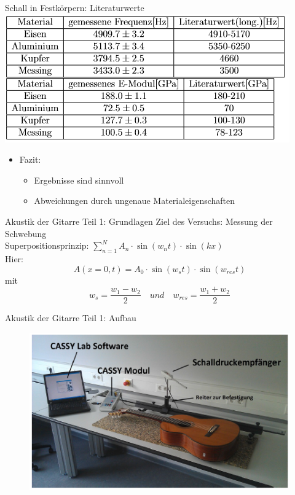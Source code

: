 \documentclass[12pt]{beamer}
\begin{document}
\begin{frame}{Schall in Festkörpern: Literaturwerte}
	\includegraphics[width=\linewidth,height=\textheight,keepaspectratio]{Bilder/Literaturwerte_Metalle.PNG}\\
	\begin{itemize}
		\item Fazit:
		\begin{itemize}
			\item Ergebnisse sind sinnvoll
			\item Abweichungen durch ungenaue Materialeigenschaften
		\end{itemize}
	\end{itemize}
\end{frame}








\begin{frame}{Akustik der Gitarre Teil 1: Grundlagen}
	Ziel des Versuchs: Messung der Schwebung \\
	Superpositionsprinzip: $\sum_{n=1}^N A_n \cdot \sin(w_nt) \cdot \sin(kx)$ \\
	Hier:
	\[A(x=0, t) = A_0 \cdot \sin(w_st) \cdot \sin(w_{res}t)\]
	mit
	\[w_s = \dfrac{w_1 - w_2}{2} \quad und \quad w_{res} = \dfrac{w_1 + w_2}{2}\]
\end{frame}

\begin{frame}{Akustik der Gitarre Teil 1: Aufbau}
	\begin{figure}
		\includegraphics[scale=0.8]{Bilder/AufbauAkustikGitarre.PNG}
		\centering
	\end{figure}
\end{frame}
\end{document}
